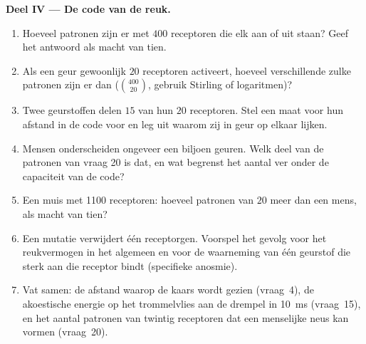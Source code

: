 \begin{problem}
\medskip
\noindent\textbf{Deel IV --- De code van de reuk.}
\begin{enumerate}[resume]
  \item Hoeveel patronen zijn er met $400$ receptoren die elk aan of
        uit staan? Geef het antwoord als macht van tien.
  \item Als een geur gewoonlijk $20$ receptoren activeert, hoeveel
        verschillende zulke patronen zijn er dan ($\binom{400}{20}$,
        gebruik Stirling of logaritmen)?
  \item Twee geurstoffen delen $15$ van hun $20$ receptoren. Stel een
        maat voor hun afstand in de code voor en leg uit waarom zij in
        geur op elkaar lijken.
  \item Mensen onderscheiden ongeveer een biljoen geuren. Welk deel van
        de patronen van vraag 20 is dat, en wat begrenst het aantal ver
        onder de capaciteit van de code?
  \item Een muis met \num{1100} receptoren: hoeveel patronen van $20$
        meer dan een mens, als macht van tien?
  \item Een mutatie verwijdert één receptorgen. Voorspel het gevolg
        voor het reukvermogen in het algemeen en voor de waarneming van
        één geurstof die sterk aan die receptor bindt (specifieke
        anosmie).
  \item Vat samen: de afstand waarop de kaars wordt gezien (vraag~4),
        de akoestische energie op het trommelvlies aan de drempel in
        \qty{10}{ms} (vraag~15), en het aantal patronen van twintig
        receptoren dat een menselijke neus kan vormen (vraag~20).
\end{enumerate}
\end{problem}
